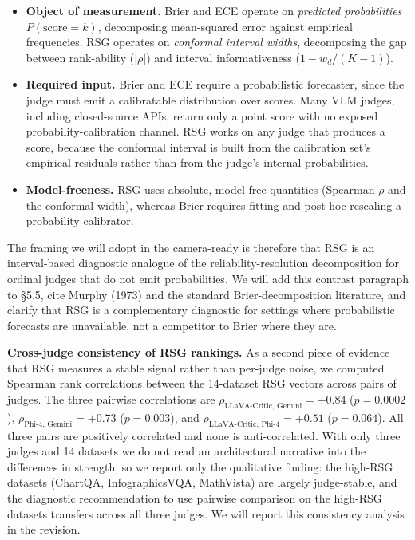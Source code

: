 \documentclass[11pt]{article}
\begin{document}
\begin{itemize}[leftmargin=*]
\item \textbf{Object of measurement.} Brier and ECE operate on \emph{predicted probabilities} $P(\text{score} = k)$, decomposing mean-squared error against empirical frequencies. RSG operates on \emph{conformal interval widths}, decomposing the gap between rank-ability ($|\rho|$) and interval informativeness ($1 - w_d/(K-1)$).
\item \textbf{Required input.} Brier and ECE require a probabilistic forecaster, since the judge must emit a calibratable distribution over scores. Many VLM judges, including closed-source APIs, return only a point score with no exposed probability-calibration channel. RSG works on any judge that produces a score, because the conformal interval is built from the calibration set's empirical residuals rather than from the judge's internal probabilities.
\item \textbf{Model-freeness.} RSG uses absolute, model-free quantities (Spearman $\rho$ and the conformal width), whereas Brier requires fitting and post-hoc rescaling a probability calibrator.
\end{itemize}

The framing we will adopt in the camera-ready is therefore that RSG is an interval-based diagnostic analogue of the reliability-resolution decomposition for ordinal judges that do not emit probabilities. We will add this contrast paragraph to \S 5.5, cite Murphy (1973) and the standard Brier-decomposition literature, and clarify that RSG is a complementary diagnostic for settings where probabilistic forecasts are unavailable, not a competitor to Brier where they are.

\textbf{Cross-judge consistency of RSG rankings.} As a second piece of evidence that RSG measures a stable signal rather than per-judge noise, we computed Spearman rank correlations between the 14-dataset RSG vectors across pairs of judges. The three pairwise correlations are $\rho_{\text{LLaVA-Critic, Gemini}} = +0.84$ ($p = 0.0002$), $\rho_{\text{Phi-4, Gemini}} = +0.73$ ($p = 0.003$), and $\rho_{\text{LLaVA-Critic, Phi-4}} = +0.51$ ($p = 0.064$). All three pairs are positively correlated and none is anti-correlated. With only three judges and 14 datasets we do not read an architectural narrative into the differences in strength, so we report only the qualitative finding: the high-RSG datasets (ChartQA, InfographicsVQA, MathVista) are largely judge-stable, and the diagnostic recommendation to use pairwise comparison on the high-RSG datasets transfers across all three judges. We will report this consistency analysis in the revision.
\end{document}
